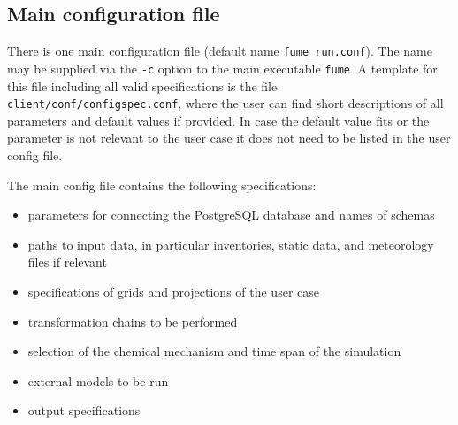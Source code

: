 \documentclass[a4paper,11pt]{article}
\begin{document}
\subsection{Main configuration file}\label{main-config}
There is one main configuration file (default name \verb|fume_run.conf|). The
name may be supplied via the \verb|-c| option to the main executable
\verb|fume|. A template for this file including all valid specifications is the file
\verb|client/conf/configspec.conf|, where the user can find short descriptions of all parameters and default values if provided. In case the default value fits or the parameter is not relevant to the user case it does not need to be listed in the user config file.

The main config file contains the following specifications:
\begin{itemize}
\item
  parameters for connecting the PostgreSQL database and names of schemas
\item
  paths to input data, in particular inventories, static data, and meteorology files if relevant
\item
  specifications of grids and projections of the user case
\item
  transformation chains to be performed
\item
  selection of the chemical mechanism and time span of the simulation  
\item
  external models to be run
\item
  output specifications
\end{itemize}
\end{document}
